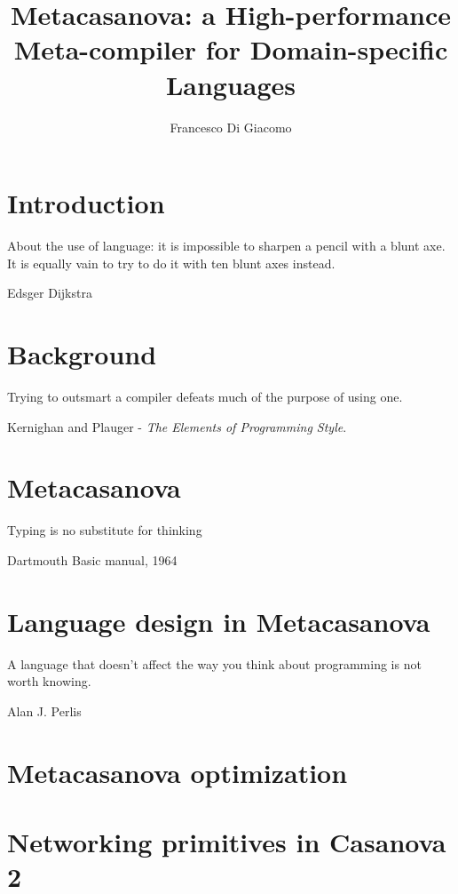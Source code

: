 \documentclass[8pt,a5paper]{extbook}
\author{Francesco Di Giacomo}
\title{Metacasanova: a High-performance Meta-compiler for Domain-specific Languages}
\date { }
\theoremstyle{definition}
\begin{document}

\newpage
\frontmatter
\maketitle

\tableofcontents

\mainmatter

\chapter{Introduction}
\label{ch:introduction}
\epigraph{About the use of language: it is impossible to sharpen a pencil with a blunt axe. It is equally vain to try to do it with ten blunt axes instead.}{Edsger Dijkstra}

	

\chapter{Background}
\label{ch:background}
\epigraph{Trying to outsmart a compiler defeats much of the purpose of using one.}{Kernighan and Plauger - \textit{The Elements of Programming Style}.}

	
\chapter{Metacasanova}
\label{ch:metacasanova}
\epigraph{Typing is no substitute for thinking}{Dartmouth Basic manual, 1964}
		

\chapter{Language design in Metacasanova}
\label{ch:languages}
\epigraph{A language that doesn't affect the way you think about programming is not worth knowing.}{Alan J. Perlis}


\chapter{Metacasanova optimization}
\label{ch:functors}

	
\chapter{Networking primitives in Casanova 2}
\label{ch:networking}

\end{document}
